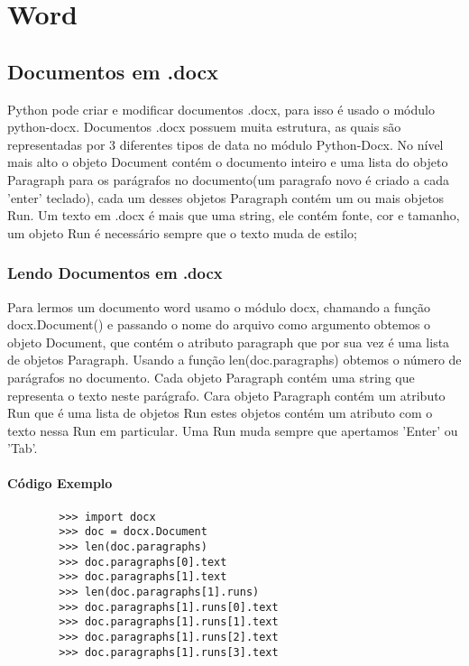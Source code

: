 \documentclass[12pt,a4paper,article]{report}
\begin{document}
\chapter{Word} \label{Trabalhando com documentos .docx}
\section{Documentos em .docx}
    Python pode criar e modificar documentos .docx, para isso é usado o módulo python-docx. Documentos .docx possuem muita estrutura, as quais são representadas por 3 diferentes tipos de data no módulo Python-Docx. No nível mais alto o objeto Document contém o documento inteiro e uma lista do objeto Paragraph para os parágrafos no documento(um paragrafo novo é criado a cada 'enter' teclado), cada um desses objetos Paragraph contém um ou mais objetos Run.
    Um texto em .docx é mais que uma string, ele contém fonte, cor e tamanho, um objeto Run é necessário sempre que o texto muda de estilo;
    
\subsection{Lendo Documentos em .docx}
    Para lermos um documento word usamo o módulo docx, chamando a função docx.Document() e passando o nome do arquivo como argumento obtemos o objeto Document, que contém o atributo paragraph que por sua vez é uma lista de objetos Paragraph. Usando a função len(doc.paragraphs) obtemos o número de parágrafos no documento. Cada objeto Paragraph contém uma string que representa o texto neste parágrafo. Cara objeto Paragraph contém um atributo Run que é uma lista de objetos Run estes objetos contém um atributo com o texto nessa Run em particular. Uma Run muda sempre que apertamos 'Enter' ou 'Tab'.
    
\subsubsection{Código Exemplo}
    \begin{verbatim}
        >>> import docx 
        >>> doc = docx.Document
        >>> len(doc.paragraphs)
        >>> doc.paragraphs[0].text 
        >>> doc.paragraphs[1].text
        >>> len(doc.paragraphs[1].runs)
        >>> doc.paragraphs[1].runs[0].text 
        >>> doc.paragraphs[1].runs[1].text
        >>> doc.paragraphs[1].runs[2].text
        >>> doc.paragraphs[1].runs[3].text
    \end{verbatim}
    
\end{document}
